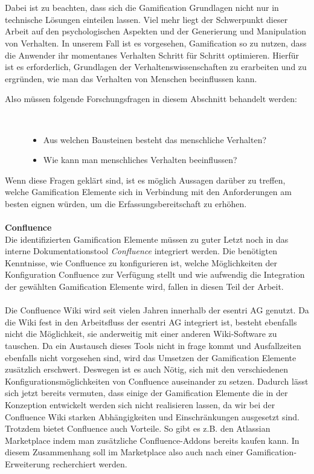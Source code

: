 \documentclass[a4paper,12pt,twoside]{scrartcl}
\begin{document}
\\\\
Dabei ist zu beachten, dass sich die Gamification Grundlagen nicht nur in technische Lösungen einteilen lassen. Viel mehr liegt der Schwerpunkt dieser Arbeit auf den psychologischen Aspekten und der Generierung und Manipulation von Verhalten. In unserem Fall ist es vorgesehen, Gamification so zu nutzen, dass die Anwender ihr momentanes Verhalten Schritt für Schritt optimieren. Hierfür ist es erforderlich, Grundlagen der Verhaltenswissenschaften zu erarbeiten und zu ergründen, wie man das Verhalten von Menschen beeinflussen kann.
\begin{description}
   \item[Also müssen folgende Forschungsfragen in diesem Abschnitt behandelt werden:]~\par
   \begin{itemize}
      \item Aus welchen Bausteinen besteht das menschliche Verhalten?
      \item Wie kann man menschliches Verhalten beeinflussen?
   \end{itemize}
\end{description}
Wenn diese Fragen geklärt sind, ist es möglich Aussagen darüber zu treffen, welche Gamification Elemente sich in Verbindung mit den Anforderungen am besten eignen würden, um die Erfassungsbereitschaft zu erhöhen.
\\\\
\textbf{Confluence}\\
Die identifizierten Gamification Elemente müssen zu guter Letzt noch in das interne Dokumentationstool \textit{Confluence} integriert werden. Die benötigten Kenntnisse, wie Confluence zu konfigurieren ist, welche Möglichkeiten der Konfiguration Confluence zur Verfügung stellt und wie aufwendig die Integration der gewählten Gamification Elemente wird, fallen in diesen Teil der Arbeit.
\\\\
Die Confluence Wiki wird seit vielen Jahren innerhalb der esentri AG genutzt. Da die Wiki fest in den Arbeitsfluss der esentri AG integriert ist, besteht ebenfalls nicht die Möglichkeit, sie anderweitig mit einer anderen Wiki-Software zu tauschen. Da ein Austausch dieses Tools nicht in frage kommt und Ausfallzeiten ebenfalls nicht vorgesehen sind, wird das Umsetzen der Gamification Elemente zusätzlich erschwert. Deswegen ist es auch Nötig, sich mit den verschiedenen Konfigurationsmöglichkeiten von Confluence auseinander zu setzen. Dadurch lässt sich jetzt bereits vermuten, dass einige der Gamification Elemente die in der Konzeption entwickelt werden sich nicht realisieren lassen, da wir bei der Confluence Wiki starken Abhängigkeiten und Einschränkungen ausgesetzt sind. Trotzdem bietet Confluence auch Vorteile. So gibt es z.B. den Atlassian Marketplace indem man zusätzliche Confluence-Addons bereits kaufen kann. In diesem Zusammenhang soll im Marketplace also auch nach einer Gamification-Erweiterung recherchiert werden.
\end{document}
